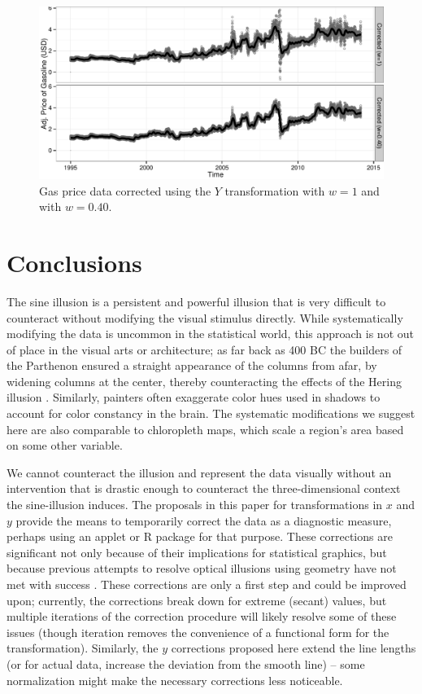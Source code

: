 \documentclass[11pt]{isuthesis}\usepackage[]{graphicx}\usepackage[]{color}
\begin{document}
\begin{figure}[h]
\centering
\includegraphics[keepaspectratio=TRUE,width=.92\textwidth]{gas-y-corrected}
\caption[Gas price data, Y transformation]{Gas price data corrected using the $Y$ transformation with $w=1$ and with $w=0.40$. }
\label{fig:gasprices-y-correct}
\end{figure}

\section{Conclusions}
The sine illusion is a persistent and powerful illusion that is very difficult to counteract without modifying the visual stimulus directly. While systematically modifying the data is uncommon in the statistical world, this approach is not out of place in the visual arts or architecture; as far back as 400 BC the builders of the Parthenon ensured a straight appearance of the columns from afar, by widening columns at the center, thereby counteracting the effects of the Hering illusion \citep{naturalscenes,hering}. Similarly, painters often exaggerate color hues used in shadows to account for color constancy in the brain. The systematic modifications we suggest here are also comparable to chloropleth maps, which scale a region's area based on some other variable. 

We cannot counteract the illusion and represent the data visually without an intervention that is drastic enough to counteract the three-dimensional context the sine-illusion induces. The proposals in this paper for transformations in $x$ and $y$ provide the means to temporarily correct the data as a diagnostic measure, perhaps using an applet or R package for that purpose. These corrections are significant not only because of their implications for statistical graphics, but because previous attempts to resolve optical illusions using geometry have not met with success \citep{westheimer2008illusions}. These corrections are only a first step and could be improved upon; currently, the corrections break down for extreme (secant) values, but multiple iterations of the correction procedure will likely resolve some of these issues (though iteration removes the convenience of a functional form for the transformation). Similarly, the $y$ corrections proposed here extend the line lengths (or for actual data, increase the deviation from the smooth line) -- some normalization might make the necessary corrections less noticeable. 
\end{document}
